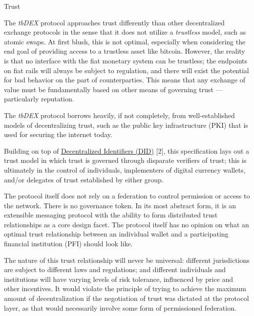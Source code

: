 \documentclass[11pt]{article}
\begin{document}
\vspace{1\baselineskip}
{\LARGE Trust}

\vspace{1\baselineskip}
The \textit{tbDEX} protocol approaches trust differently than other decentralized exchange protocols in the sense that it does not utilize a \textit{trustless} model, such as atomic swaps. At first blush, this is not optimal, especially when considering the end goal of providing access to a trustless asset like bitcoin. However, the reality is that no interface with the fiat monetary system can be trustless; the endpoints on fiat rails will always be subject to regulation, and there will exist the potential for bad behavior on the part of counterparties. This means that any exchange of value must be fundamentally based on other means of governing trust \textcolor[HTML]{202124}{— }particularly reputation. 

\vspace{1\baselineskip}
The \textit{tbDEX} protocol borrows heavily, if not completely, from well-established models of decentralizing trust, such as the public key infrastructure (PKI) that is used for securing the internet today. 

\vspace{1\baselineskip}
Building on top of \href{https://www.w3.org/TR/did-core}{\uline{\textcolor[HTML]{1155CC}{Decentralized Identifiers (DID)}}} [2], this specification lays out a trust model in which trust is governed through disparate verifiers of trust; this is ultimately in the control of individuals, implementers of digital currency wallets, and/or delegates of trust established by either group. 

\vspace{1\baselineskip}
The protocol itself does not rely on a federation to control permission or access to the network. There is no governance token. In its most abstract form, it is an extensible messaging protocol with the ability to form distributed trust relationships as a core design facet. The protocol itself has no opinion on what an optimal trust relationship between an individual wallet and a participating financial institution (PFI) should look like. 

\vspace{1\baselineskip}
The nature of this trust relationship will never be universal: different jurisdictions are subject to different laws and regulations; and different individuals and institutions will have varying levels of risk tolerance, influenced by price and other incentives. It would violate the principle of trying to achieve the maximum amount of decentralization if the negotiation of trust was dictated at the protocol layer, as that would necessarily involve some form of permissioned federation. 
\end{document}
